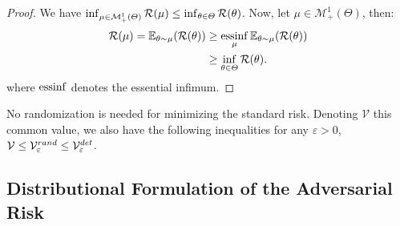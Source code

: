 \begin{proof}
We have $\inf_{\mu\in\mathcal{M}^1_+(\Theta)} \mathcal{R}(\mu) \leq \inf_{\theta\in\Theta} \mathcal{R}(\theta)$. Now, let $\mu\in\mathcal{M}^1_+(\Theta)$, then:
\begin{align*}
    \risk(\mu)= \mathbb{E}_{\theta\sim\mu}(\risk(\theta))&\geq \essinf_\mu \mathbb{E}_{\theta\sim\mu} \left(\risk(\theta)\right)\\
    &\geq\inf_{\theta\in\Theta} \risk(\theta).
\end{align*}
where $\operatorname*{essinf}$ denotes the essential infimum.
\end{proof}
\begin{rmq}
No randomization is needed for minimizing the standard risk. Denoting $\mathcal{V}$ this common value, we also have the following inequalities for any $\varepsilon>0$, $\mathcal{V}\leq \mathcal{V}^{rand}_\varepsilon\leq \mathcal{V}^{det}_\varepsilon$.
\end{rmq}



\subsection{Distributional Formulation of the Adversarial Risk} 

